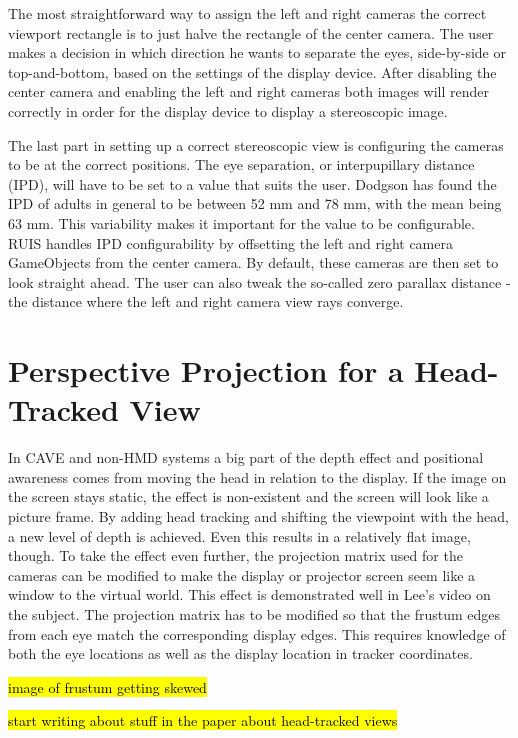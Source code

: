 \documentclass[12pt,a4paper,oneside,pdftex]{report}
\begin{document}
The most straightforward way to assign the left and right cameras the correct viewport rectangle is to just halve the rectangle of the center camera. The user makes a decision in which direction he wants to separate the eyes, side-by-side or top-and-bottom, based on the settings of the display device. After disabling the center camera and enabling the left and right cameras both images will render correctly in order for the display device to display a stereoscopic image.

The last part in setting up a correct stereoscopic view is configuring the cameras to be at the correct positions. The eye separation, or interpupillary distance (IPD), will have to be set to a value that suits the user. Dodgson  \cite{Dodgson04variationand} has found the IPD of adults in general to be between 52 mm and 78 mm, with the mean being 63 mm. This variability makes it important for the value to be configurable. RUIS handles IPD configurability by offsetting the left and right camera GameObjects from the center camera. By default, these cameras are then set to look straight ahead. The user can also tweak the so-called zero parallax distance - the distance where the left and right camera view rays converge.

\section{Perspective Projection for a Head-Tracked View}
\label{section:perspectiveprojection}

In CAVE and non-HMD systems a big part of the depth effect and positional awareness comes from moving the head in relation to the display. If the image on the screen stays static, the effect is non-existent and the screen will look like a picture frame. By adding head tracking and shifting the viewpoint with the head, a new level of depth is achieved. Even this results in a relatively flat image, though. To take the effect even further, the projection matrix used for the cameras can be modified to make the display or projector screen seem like a window to the virtual world. This effect is demonstrated well in Lee's \cite{JohnnyLeePerspective} video on the subject. The projection matrix has to be modified so that the frustum edges from each eye match the corresponding display edges. This requires knowledge of both the eye locations as well as the display location in tracker coordinates.

\hl{image of frustum getting skewed}

\cite{KooimaPerspective}
\hl{start writing about stuff in the paper about head-tracked views}
\end{document}
